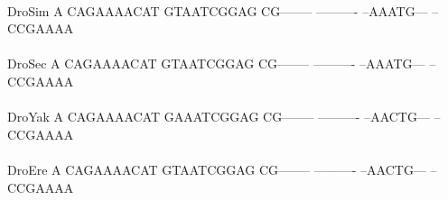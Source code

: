 \documentclass[11pt,twoside,reqno,a4paper]{article}
\begin{document}
{\hspace*{7\charwidth}\hspace*{1\charwidth}\hspace*{1\charwidth}\hspace*{1\charwidth}\hspace*{1\charwidth}\hspace*{1\charwidth}\hspace*{1\charwidth}\\
DroSim	A	CAGAAAACAT	GTAATCGGAG	CG--------	----------	--AAATG---	--CCGAAAA\\
\hspace*{7\charwidth}\hspace*{1\charwidth}\hspace*{1\charwidth}\hspace*{1\charwidth}\hspace*{1\charwidth}\hspace*{1\charwidth}\hspace*{1\charwidth}\\
DroSec	A	CAGAAAACAT	GTAATCGGAG	CG--------	----------	--AAATG---	--CCGAAAA\\
\hspace*{7\charwidth}\hspace*{1\charwidth}\hspace*{1\charwidth}\hspace*{1\charwidth}\hspace*{1\charwidth}\hspace*{1\charwidth}\hspace*{1\charwidth}\\
DroYak	A	CAGAAAACAT	GAAATCGGAG	CG--------	----------	--AACTG---	--CCGAAAA\\
\hspace*{7\charwidth}\hspace*{1\charwidth}\hspace*{1\charwidth}\hspace*{1\charwidth}\hspace*{1\charwidth}\hspace*{1\charwidth}\hspace*{1\charwidth}\\
DroEre	A	CAGAAAACAT	GTAATCGGAG	CG--------	----------	--AACTG---	--CCGAAAA\\
\hspace*{7\charwidth}\hspace*{1\charwidth}\hspace*{1\charwidth}\hspace*{1\charwidth}\hspace*{1\charwidth}\hspace*{1\charwidth}\hspace*{1\charwidth}\\
}
\end{document}
